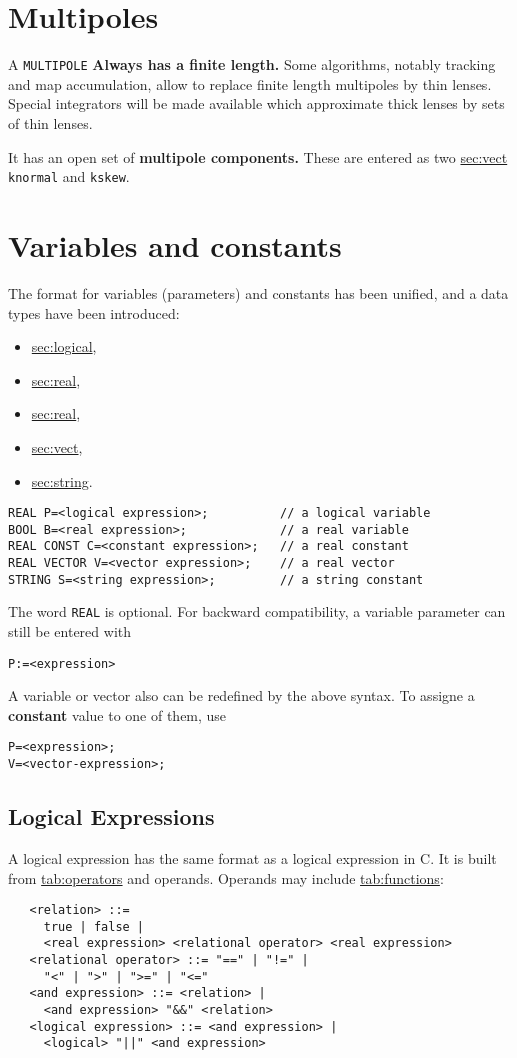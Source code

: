 \documentclass{article}
\newcommand{\secref}[2]{\hyperref{#1}{#1 (see Section~}{)}{sec:#2}}
\newcommand{\tabref}[2]{\hyperref{#1}{#1 (see Table~}{)}{tab:#2}}
\begin{document}
\section{Multipoles}
A \texttt{MULTIPOLE} \textbf{Always has a finite length.}
Some algorithms, notably tracking and map accumulation,
allow to replace finite length multipoles by thin lenses.
Special integrators will be made available which approximate thick lenses 
by sets of thin lenses.

It has an open set of \textbf{multipole components.}
These are entered as two \secref{vectors}{vect} 
\texttt{knormal} and \texttt{kskew}.

\section{Variables and constants}
The format for variables (parameters) and constants has been unified,
and a data types have been introduced:
\begin{itemize}
\item \secref{logical variable}{logical},
\item \secref{real constant}{real},
\item \secref{real variable}{real},
\item \secref{real vector}{vect},
\item \secref{string variable}{string}.
\end{itemize}
\begin{verbatim}
REAL P=<logical expression>;          // a logical variable
BOOL B=<real expression>;             // a real variable
REAL CONST C=<constant expression>;   // a real constant
REAL VECTOR V=<vector expression>;    // a real vector
STRING S=<string expression>;         // a string constant
\end{verbatim}
The word \texttt{REAL} is optional.
For backward compatibility, a variable parameter can still be entered with
\begin{verbatim}
P:=<expression>
\end{verbatim}
A variable or vector also can be redefined by the above syntax.
To assigne a \textbf{constant} value to one of them, use
\begin{verbatim}
P=<expression>;
V=<vector-expression>;
\end{verbatim}

\subsection{Logical Expressions}
\label{sec:logical}
A logical expression has the same format as a logical expression in C.
It is built from \tabref{operators}{operators} and operands.
Operands may include \tabref{functions}{functions}:
\begin{verbatim}
   <relation> ::=
     true | false |
     <real expression> <relational operator> <real expression>
   <relational operator> ::= "==" | "!=" |
     "<" | ">" | ">=" | "<="
   <and expression> ::= <relation> |
     <and expression> "&&" <relation>
   <logical expression> ::= <and expression> |
     <logical> "||" <and expression>
\end{verbatim}
\end{document}

